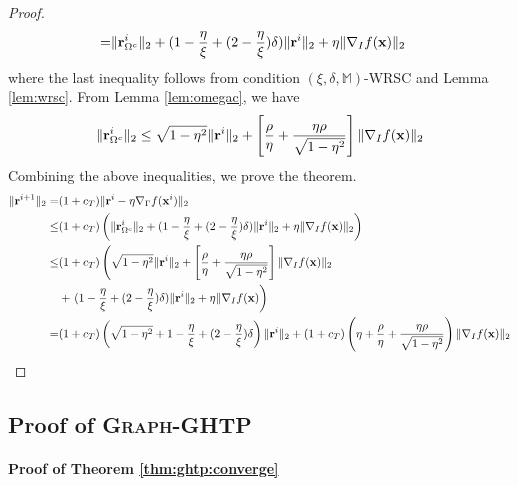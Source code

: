 \documentclass{article}
\begin{document}
\begin{proof}
\begin{align*}
=&\|{\bf r}_{\Omega^c}^i\|_2+(1-\frac{\eta}{\xi}+(2-\frac{\eta}{\xi})\delta)\|{\bf r}^i\|_2+\eta\|\nabla_I f({\bf x})\|_2
\end{align*}
where the last inequality follows from condition $(\xi,\delta,\mathbb{M})$-WRSC and Lemma \ref{lem:wrsc}. From Lemma \ref{lem:omegac}, we have
\[
\|{\bf r}_{\Omega^c}^i\|_2\leq\sqrt{1-\eta^2}\|{\bf r}^i\|_2+\left[\frac{\rho}{\eta}+\frac{\eta\rho}{\sqrt{1-\eta^2}} \right]\|\nabla_I f({\bf x})\|_2
\]
Combining the above inequalities, we prove the theorem.
\begin{align*}
\|{\bf r}^{i+1}\|_2=&(1+c_T)\|{\bf r}^i-\eta\nabla_{\Gamma}f({\bf x}^i)\|_2\\
\leq&(1+c_T)\left(\|{\bf r}_{\Omega^c}^i\|_2+(1-\frac{\eta}{\xi}+(2-\frac{\eta}{\xi})\delta)\|{\bf r}^i\|_2+\eta\|\nabla_I f({\bf x})\|_2 \right)\\
\leq&(1+c_T)\left(\sqrt{1-\eta^2}\|{\bf r}^i\|_2+\left[\frac{\rho}{\eta}+\frac{\eta\rho}{\sqrt{1-\eta^2}} \right]\|\nabla_I f({\bf x})\|_2\right.\\
&+\left.(1-\frac{\eta}{\xi}+(2-\frac{\eta}{\xi})\delta)\|{\bf r}^i\|_2+\eta\|\nabla_I f({\bf x}) \right)\\
=&(1+c_T)\left(\sqrt{1-\eta^2}+1-\frac{\eta}{\xi}+(2-\frac{\eta}{\xi})\delta\right)\|{\bf r}^i\|_2+(1+c_T)\left(\eta+\frac{\rho}{\eta}+\frac{\eta\rho}{\sqrt{1-\eta^2}} \right)\|\nabla_I f({\bf x})\|_2
\end{align*}
\end{proof}

\subsection{Proof of \textsc{Graph}-GHTP}

\paragraph{Proof of Theorem \ref{thm:ghtp:converge}}
\end{document}
